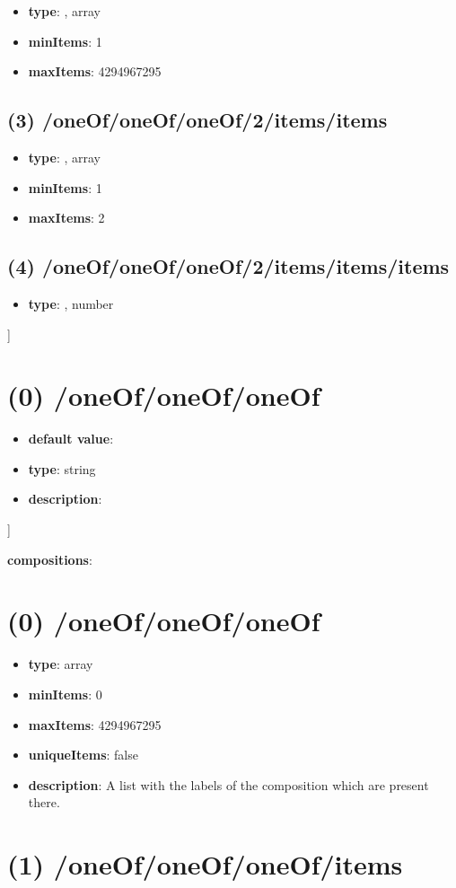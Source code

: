 \begin{itemize}[leftmargin=2em]\item {\bf type}: , array\item {\bf minItems}: 1
\item {\bf maxItems}: 4294967295
\end{itemize}\subsection{(3) /oneOf/oneOf/oneOf/2/items/items}
\begin{itemize}[leftmargin=3em]\item {\bf type}: , array\item {\bf minItems}: 1
\item {\bf maxItems}: 2
\end{itemize}\subsection{(4) /oneOf/oneOf/oneOf/2/items/items/items}
\begin{itemize}[leftmargin=4em]\item {\bf type}: , number\end{itemize}]\section{(0) /oneOf/oneOf/oneOf}
\begin{itemize}[leftmargin=0em]\item {\bf default value}: 
\item {\bf type}: string
\item {\bf description}: 
\end{itemize}]\item {\bf compositions}: \section{(0) /oneOf/oneOf/oneOf}
\begin{itemize}[leftmargin=0em]\item {\bf type}: array
\item {\bf minItems}: 0
\item {\bf maxItems}: 4294967295
\item {\bf uniqueItems}: false
\item {\bf description}: A list with the labels of the composition which are present there.
\end{itemize}\section{(1) /oneOf/oneOf/oneOf/items}
